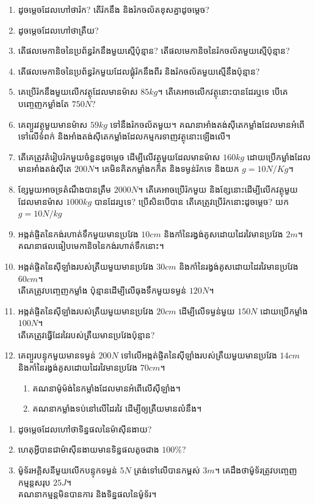 \documentclass{officialexam}
\begin{document}
\begin{enumerate}[m]
	\item ដូចម្តេចដែលហៅថារ៉ក? តើរ៉កនឹង និងរ៉កចល័តខុសគ្នាដូចម្តេច?
	\item ដូចម្តេចដែលហៅថាត្រឺយ?
	\item តើផលមេកានិចនៃប្រព័ន្ធរ៉កនឹងមួយស្មើប៉ុន្មាន? តើផលមេកានិចនៃរ៉កចល័តមួយស្មើប៉ុន្មាន?
	\item តើផលមេកានិចនៃប្រព័ន្ធរ៉កមួយដែលផ្គុំរ៉កនឹងពីរ និងរ៉កចល័តមួយស្មើនឹងប៉ុន្មាន?
	\item គេប្រើរ៉កនឹងមួយលើកវត្ថុដែលមានម៉ាស $85kg$។ តើគេអាចលើកវត្ថុនោះបានដែរឬទេ បើគេបញ្ចេញកម្លាំងតែ $750N$?
	\item គេព្យួរវត្ថុមួយមានម៉ាស $59kg$ ទៅនឹងរ៉កចល័តមួយ។ គណនាអាំងតង់សុីតេកម្លាំងដែលមានអំពើទៅលើទំពក់ និងអាំងតង់សុីតេកម្លាំងដែលកម្មករទាញវត្ថុនោះឡើងលើ។
	\item តើគេត្រូវតំរៀបរ៉កមួយចំនួនដូចម្តេច ដើម្បីលើវត្ថុមួយដែលមានម៉ាស $160kg$ ដោយប្រើកម្លាំងដែលមានអាំងតង់សុីតេ $200N$។ គេមិនគិតកម្លាំងកកិត និងទម្ងន់រ៉កទេ និងយក $g=10N/Kg$។
	\item ខ្សែមួយអាចទ្រតំណឹងបានត្រឹម $2000N$។ តើគេអាចប្រើរ៉កមួយ និងខ្សែនោះដើម្បីលើកវត្ថុមួយដែលមានម៉ាស $1000kg$ បានដែរឬទេ? ប្រើសិនបើបាន តើគេត្រូវប្រើរ៉កនោះដូចម្តេច? យក $g=10N/kg$
	\item អង្កត់ផ្ចិតនៃកង់រហាត់ទឹកមួយមានប្រវែង $10cm$ និងកាំនៃរង្វង់គូសដោយដៃរវៃមានប្រវែង $2m$។\\ គណនាផលធៀបមេកានិចនៃកង់រហាត់ទឹកនោះ។
	\item អង្កត់ផ្ចិតនៃសុីឡាំងរបស់ត្រឺយមួយមានប្រវែង $30cm$ និងកាំនៃរង្វង់គូសដោយដៃរវៃមានប្រវែង $60cm$។ \\តើគេត្រូវបញ្ចេញកម្លាំង ប៉ុន្មានដើម្បីលើធុងទឹកមួយទម្ងន់ $120N$។
	\item អង្កត់ផ្ចិតនៃសុីឡាំងរបស់ត្រឺយមួយមានប្រវែង $20cm$ ដើម្បីលើទម្ងន់មួយ $150N$ ដោយប្រើកម្លាំង $100N$។\\ តើគេត្រូវធ្វើដែរវៃរបស់ត្រឺយមានប្រវែងប៉ុន្មាន?
	\item គេព្យួរបន្ទុកមួយមានទម្ងន់ $200N$ ទៅលើអង្កត់ផ្ចិតនៃសុីឡាំងរបស់ត្រឺយមួយមានប្រវែង $14cm$ និងកាំនៃរង្វង់គូសដោយដៃរវៃមានប្រវែង $70cm$។
	\begin{enumerate}[k]
		\item គណនាម៉ូម៉ង់នៃកម្លាំងដែលមានអំពើលើសុីឡាំង។
		\item គណនាកម្លាំងទប់នៅលើដៃរវៃ ដើម្បីឲ្យត្រឺយមានលំនឹង។
	\end{enumerate}
\end{enumerate}
\begin{enumerate}[m]
	\item ដូចម្តេចដែលហៅថាទិន្នផលនៃម៉ាសុីនងាយ?
	\item ហេតុអ្វីបានជាម៉ាសុីនងាយមានទិន្នផលតូចជាង $100\%$?
	\item ម៉ូទ័រអគ្គិសនីមួយលើកបន្ទុកទម្ងន់ $5N$ ត្រង់ទៅលើបានកម្ពស់ $3m$។ គេដឹងថាម៉ូទ័រត្រូវបញ្ចេញកម្មន្តសរុប $25J$។\\
	គណនាកម្មន្តមិនបានការ និងទិន្នផលនៃម៉ូទ័រ។
\end{enumerate}\newpage
\end{document}

